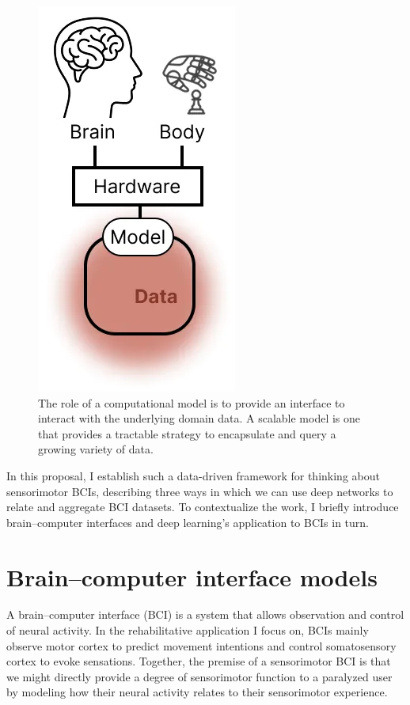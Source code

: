 \documentclass[12pt,oneside]{report}
\begin{document}
\begin{figure}[h]
  \centering
  \includegraphics[width=0.5\linewidth]{ch1_bci_schema.png}
  \caption{The role of a computational model is to provide an interface to interact with the underlying domain data. A scalable model is one that provides a tractable strategy to encapsulate and query a growing variety of data.}
  \label{fig:bci_schema}
\end{figure}

In this proposal, I establish such a data-driven framework for thinking about sensorimotor BCIs, describing three ways in which we can use deep networks to relate and aggregate BCI datasets. To contextualize the work, I briefly introduce brain--computer interfaces and deep learning’s application to BCIs in turn.

\section{Brain--computer interface models}

A brain--computer interface (BCI) is a system that allows observation and control of neural activity. In the rehabilitative application I focus on, BCIs mainly observe motor cortex to predict movement intentions and control somatosensory cortex to evoke sensations. Together, the premise of a sensorimotor BCI is that we might directly provide a degree of sensorimotor function to a paralyzed user by modeling how their neural activity relates to their sensorimotor experience.
\end{document}
